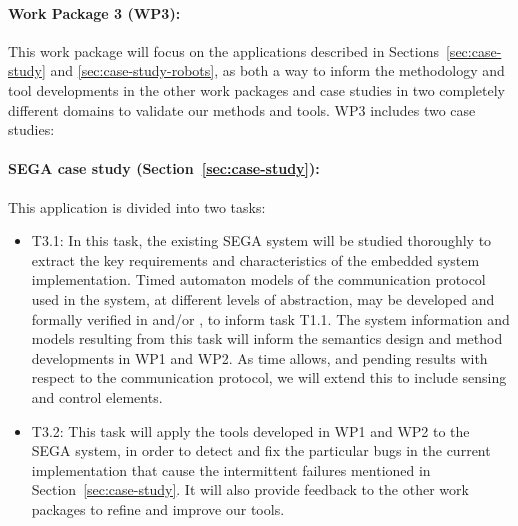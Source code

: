 \paragraph{Work Package 3 (WP3):}  This work package will focus on the applications described in Sections~\ref{sec:case-study} and \ref{sec:case-study-robots}, as both a way to inform the methodology and tool developments in the other work packages and case studies in two completely different domains to validate our methods and tools.
WP3 includes two case studies:
\paragraph{SEGA case study (Section~\ref{sec:case-study}):} This application is divided into two tasks:
\noindent  \begin{itemize}[labelsep=3pt,leftmargin=12pt]
  \item T3.1: In this task, the existing SEGA system will be
    studied thoroughly to extract the key requirements and
    characteristics of the embedded system implementation.  Timed
    automaton models of the communication protocol used in the system,
    at different levels of abstraction, may be developed and formally
    verified in \uppaal and/or \prism, to inform task T1.1. The system information and models
    resulting from this task will inform the semantics design and method
    developments in WP1 and WP2. As time allows, and pending results
    with respect to the communication protocol, we will extend this to include sensing
    and control elements.
  \item T3.2: This task will apply the tools developed in WP1 and WP2
    to the SEGA system, in order to detect and fix the particular bugs in the current
    implementation that cause the intermittent failures mentioned in
    Section~\ref{sec:case-study}.  It will also provide feedback to
    the other work packages to refine and improve our tools.
  \end{itemize}

